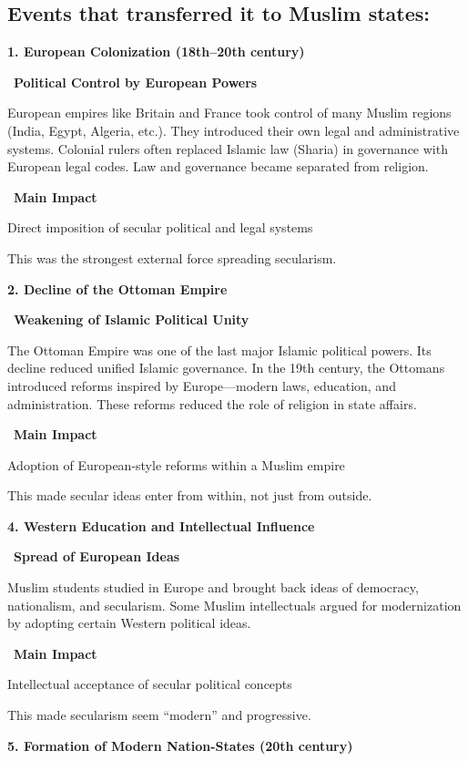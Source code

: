 \documentclass[12pt]{article}
\begin{document}
\subsection*{Events that transferred it to Muslim states:}

\textbf{1. European Colonization (18th–20th century)}

\textbullet\ \textbf{Political Control by European Powers}

European empires like Britain and France took control of many Muslim regions (India, Egypt, Algeria, etc.). They introduced their own legal and administrative systems. Colonial rulers often replaced Islamic law (Sharia) in governance with European legal codes. Law and governance became separated from religion.

\textbullet\ \textbf{Main Impact}

Direct imposition of secular political and legal systems

This was the strongest external force spreading secularism.

\textbf{2. Decline of the Ottoman Empire}

\textbullet\ \textbf{Weakening of Islamic Political Unity}

The Ottoman Empire was one of the last major Islamic political powers. Its decline reduced unified Islamic governance. In the 19th century, the Ottomans introduced reforms inspired by Europe—modern laws, education, and administration. These reforms reduced the role of religion in state affairs.

\textbullet\ \textbf{Main Impact}

Adoption of European-style reforms within a Muslim empire

This made secular ideas enter from within, not just from outside.

\textbf{4. Western Education and Intellectual Influence}

\textbullet\ \textbf{Spread of European Ideas}

Muslim students studied in Europe and brought back ideas of democracy, nationalism, and secularism. Some Muslim intellectuals argued for modernization by adopting certain Western political ideas.

\textbullet\ \textbf{Main Impact}

Intellectual acceptance of secular political concepts

This made secularism seem “modern” and progressive.

\textbf{5. Formation of Modern Nation-States (20th century)}
\end{document}
